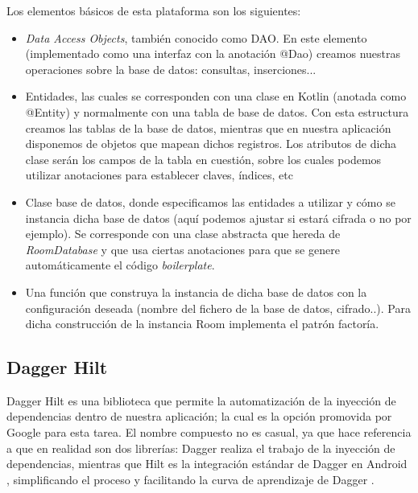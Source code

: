             Los elementos básicos de esta plataforma son los siguientes:
            \begin{itemize}
                \item \textit{Data Access Objects}, también conocido como DAO. En este elemento (implementado como
                una interfaz con la anotación @Dao) creamos nuestras
                operaciones sobre la base de datos: consultas, inserciones...
                \item Entidades, las cuales se corresponden con una clase en Kotlin (anotada como @Entity)
                y normalmente con una tabla de base de datos.
                Con esta estructura creamos las tablas de la base de datos, mientras que en nuestra aplicación 
                disponemos de objetos que mapean dichos registros. Los atributos de dicha clase serán los campos de
                la tabla en cuestión, sobre los cuales podemos utilizar anotaciones para establecer claves, índices, etc
                \item Clase base de datos, donde especificamos las entidades a utilizar y cómo se instancia dicha base
                de datos (aquí podemos ajustar si estará cifrada o no por ejemplo). Se corresponde con una clase 
                abstracta que hereda de \textit{RoomDatabase} y que usa ciertas anotaciones para que se genere 
                automáticamente el código \textit{boilerplate}.
                \item Una función que construya la instancia de dicha base de datos con la configuración deseada
                (nombre del fichero de la base de datos, cifrado..). Para dicha construcción de la instancia Room
                implementa el patrón factoría.
            \end{itemize}
            
        \subsection{Dagger Hilt}
            Dagger Hilt es una biblioteca que permite la automatización de la inyección de dependencias dentro de 
            nuestra aplicación; la cual es la opción promovida por Google para esta tarea. El nombre
            compuesto no es casual, ya que hace referencia a que en realidad son dos librerías: Dagger realiza el
            trabajo de la inyección de dependencias, mientras que Hilt es la integración estándar de Dagger en Android 
            \cite{noauthor_insercion_nodate}, simplificando el proceso y facilitando la curva de aprendizaje de Dagger
            \cite{leiva_dagger_2020}.

